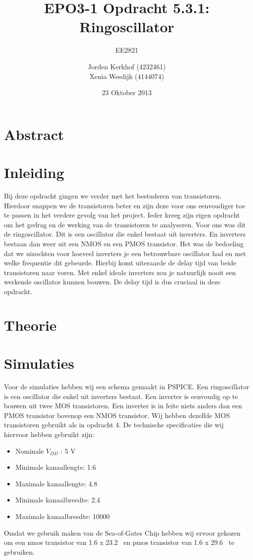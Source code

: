 \documentclass{scrartcl}  %
\author{Jorden {Kerkhof} (4232461)  \\{Xenia Wesdijk} (4144074)}
\title{EPO3-1   Opdracht 5.3.1: Ringoscillator}
\subtitle{EE2821}
\date{23 Oktober 2013}
\begin{document}
\maketitle
\vspace{80 mm}
\section*{Abstract}

\newpage
\setlength{\cftbeforetoctitleskip}{-3em}
\tableofcontents
\newpage
{}
\section{Inleiding}
Bij deze opdracht gingen we verder met het bestuderen van transistoren. Hierdoor snappen we de transistoren beter en zijn deze voor ons eenvoudiger toe te passen in het verdere gevolg van het project. Ieder kreeg zijn eigen opdracht om het gedrag en de werking van de transistoren te analyseren. Voor ons was dit de ringoscillator. Dit is een oscillator die enkel bestaat uit inverters. En inverters bestaan dan weer uit een NMOS en een PMOS transistor. Het was de bedoeling dat we uizochten voor hoeveel inverters je een betrouwbare oscillator had en met welke frequentie dit gebeurde. Hierbij komt uiteraarde de delay tijd van beide transistoren naar voren. Met enkel ideale inverters zou je natuurlijk nooit een werkende oscillator kunnen bouwen. De delay tijd is dus cruciaal in deze opdracht.  

\section{Theorie}

\section{Simulaties}
Voor de simulaties hebben wij een schema gemaakt in PSPICE. Een ringoscillator is een oscillator die enkel uit inverters bestaat. Een inverter is eenvoudig op te bouwen uit twee MOS transistoren. Een inverter is in feite niets anders dan een PMOS transistor bovenop een NMOS transistor. Wij hebben dezelfde MOS transistoren gebruikt als in opdracht 4. De technische specificaties die wij hiervoor hebben gebruikt zijn:
\begin{itemize}
	\item Nominale $V_{DD}$ : 5 V
	\item Minimale kanaallengte: 1.6  \micro\meter\
	\item Maximale kanaallengte: 4.8 \micro\meter\
	\item Minimale kanaalbreedte: 2.4 \micro\meter\
	\item Maximale kanaalbreedte: 10000 \micro\meter\
\end{itemize}
Omdat we gebruik maken van de Sea-of-Gates Chip hebben wij ervoor gekozen om een nmos transistor van 1.6 x 23.2 \micro\meter\ en pmos transistor van 1.6 x 29.6 \micro\meter\ te gebruiken.
\end{document}
